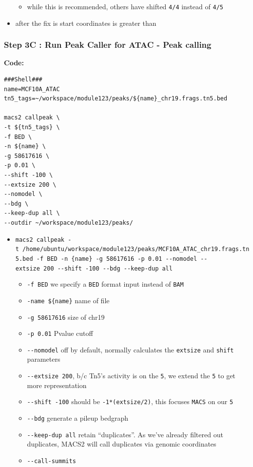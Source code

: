 \documentclass[
]{book}
\providecommand{\tightlist}{%
  \setlength{\itemsep}{0pt}\setlength{\parskip}{0pt}}
\begin{document}
\begin{itemize}
  \begin{itemize}
  \tightlist
  \item
    while this is recommended, others have shifted \texttt{4/4} instead of \texttt{4/5}\\
  \end{itemize}
\item
  after the fix is start coordinates is greater than
\end{itemize}

\subsubsection{Step 3C : Run Peak Caller for ATAC - Peak calling}\label{step-3c-run-peak-caller-for-atac---peak-calling}

\textbf{Code:}

\begin{verbatim}
###Shell###
name=MCF10A_ATAC
tn5_tags=~/workspace/module123/peaks/${name}_chr19.frags.tn5.bed

macs2 callpeak \
-t ${tn5_tags} \
-f BED \
-n ${name} \
-g 58617616 \
-p 0.01 \
--shift -100 \
--extsize 200 \
--nomodel \
--bdg \
--keep-dup all \
--outdir ~/workspace/module123/peaks/
\end{verbatim}

\begin{itemize}
\tightlist
\item
  \texttt{macs2\ callpeak\ -t\ /home/ubuntu/workspace/module123/peaks/MCF10A\_ATAC\_chr19.frags.tn5.bed\ -f\ BED\ -n\ \{name\}\ -g\ 58617616\ -p\ 0.01\ -\/-nomodel\ -\/-extsize\ 200\ -\/-shift\ -100\ -\/-bdg\ -\/-keep-dup\ all}

  \begin{itemize}
  \tightlist
  \item
    \texttt{-f\ BED} we specify a \texttt{BED} format input instead of \texttt{BAM}
  \item
    \texttt{-name\ \$\{name\}} name of file
  \item
    \texttt{-g\ 58617616} size of chr19
  \item
    \texttt{-p\ 0.01} Pvalue cutoff
  \item
    \texttt{-\/-nomodel} off by default, normally calculates the \texttt{extsize} and \texttt{shift} parameters
  \item
    \texttt{-\/-extsize\ 200}, b/c Tn5's activity is on the \texttt{5\textquotesingle{}}, we extend the \texttt{5\textquotesingle{}} to get more representation
  \item
    \texttt{-\/-shift\ -100} should be \texttt{-1*(extsize/2)}, this focuses \texttt{MACS} on our \texttt{5\textquotesingle{}}
  \item
    \texttt{-\/-bdg} generate a pileup bedgraph
  \item
    \texttt{-\/-keep-dup\ all} retain ``duplicates''. As we've already filtered out duplicates, MACS2 will call duplicates via genomic coordinates
  \item
    \texttt{-\/-call-summits}
  \end{itemize}
\end{itemize}
\end{document}
